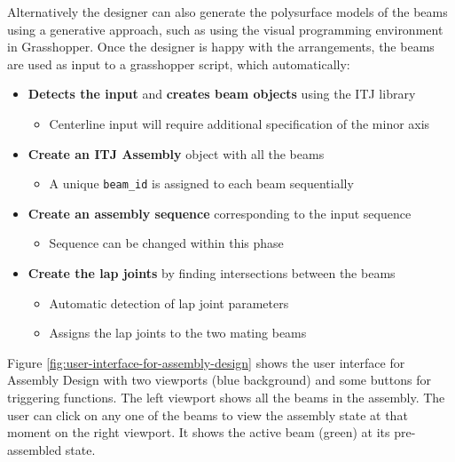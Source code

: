 Alternatively the designer can also generate the polysurface models of the beams using a generative approach, such as using the visual programming environment in Grasshopper. Once the designer is happy with the arrangements, the beams are used as input to a grasshopper script, which automatically:

\begin{itemize}[nosep]
    \item \textbf{Detects the input} and \textbf{creates beam objects} using the ITJ library 
    \begin{itemize}
        \item Centerline input will require additional specification of the minor axis
    \end{itemize}
    \item \textbf{Create an ITJ Assembly} object with all the beams
    \begin{itemize}
        \item A unique \verb|beam_id| is assigned to each beam sequentially
    \end{itemize}
    \item \textbf{Create an assembly sequence} corresponding to the input sequence
    \begin{itemize}
        \item Sequence can be changed within this phase
    \end{itemize}
    \item \textbf{Create the lap joints} by finding intersections between the beams
    \begin{itemize}
        \item Automatic detection of lap joint parameters
        \item Assigns the lap joints to the two mating beams
    \end{itemize}
\end{itemize}

Figure \ref{fig:user-interface-for-assembly-design} shows the user interface for Assembly Design with two viewports (blue background) and some buttons for triggering functions. The left viewport shows all the beams in the assembly. The user can click on any one of the beams to view the assembly state at that moment on the right viewport. It shows the active beam (green) at its pre-assembled state.

